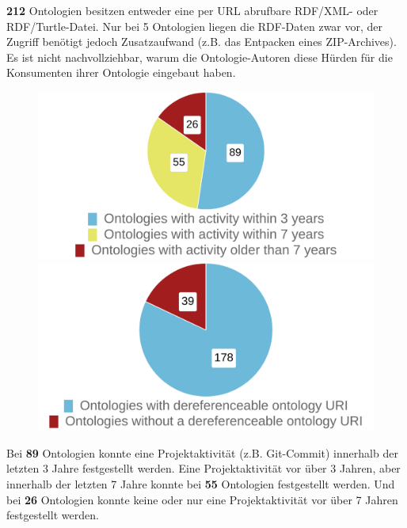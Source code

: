 \documentclass{article}
\begin{document}
\textbf{212} Ontologien besitzen entweder eine per URL abrufbare RDF/XML- oder RDF/Turtle-Datei.
Nur bei 5 Ontologien liegen die RDF-Daten zwar vor, der Zugriff benötigt jedoch Zusatzaufwand (z.B. das Entpacken eines ZIP-Archives).
Es ist nicht nachvollziehbar, warum die Ontologie-Autoren diese Hürden für die Konsumenten ihrer Ontologie eingebaut haben.

\begin{figure}[H]
    \begin{minipage}[c]{0.4\linewidth}
        \includegraphics[scale=0.14]{pie-activity-37}
        \centering
        \caption{}
    \end{minipage}
    \hfill
    \begin{minipage}[c]{0.4\linewidth}
        \centering
        \includegraphics[scale=0.14]{pie-dereferenceable-ontology-uri}
        \caption{}
    \end{minipage}%
\end{figure}

Bei \textbf{89} Ontologien konnte eine Projektaktivität (z.B. Git-Commit) innerhalb der letzten 3 Jahre festgestellt werden.
Eine Projektaktivität vor über 3 Jahren, aber innerhalb der letzten 7 Jahre konnte bei \textbf{55} Ontologien festgestellt werden.
Und bei \textbf{26} Ontologien konnte keine oder nur eine Projektaktivität vor über 7 Jahren festgestellt werden.
\end{document}
